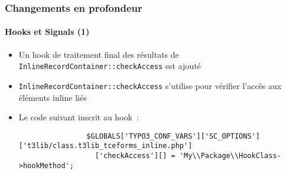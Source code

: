 \begin{frame}[fragile]
	\frametitle{Changements en profondeur}
	\framesubtitle{Hooks et Signals (1)}

	\lstset{basicstyle=\tiny\ttfamily}

	\begin{itemize}

		\item Un hook de traitement final des résultats de \texttt{InlineRecordContainer::checkAccess} est ajouté

		\item \texttt{InlineRecordContainer::checkAccess} s'utilise pour vérifier l'accès aux éléments inline liés

		\item Le code suivant inscrit au hook~:

			\begin{lstlisting}
				$GLOBALS['TYPO3_CONF_VARS']['SC_OPTIONS']['t3lib/class.t3lib_tceforms_inline.php']
				  ['checkAccess'][] = 'My\\Package\\HookClass->hookMethod';
			\end{lstlisting}

	\end{itemize}

\end{frame}



